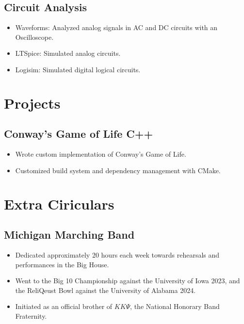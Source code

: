 \documentclass[10pt, letterpaper]{article}
\begin{document}
\subsection*{Circuit Analysis}
\begin{itemize}[noitemsep]
	\item Waveforms: Analyzed analog signals in AC and DC circuits with an Oscilloscope.	
	\item LTSpice: Simulated analog circuits.
	\item Logisim: Simulated digital logical circuits.
\end{itemize}

\section*{Projects}
\subsection*{Conway's Game of Life \text{\text{|}} C++}
\begin{itemize}[noitemsep]
	\item Wrote custom implementation of Conway's Game of Life.
	\item Customized build system and dependency management with CMake.
\end{itemize}

\section*{Extra Ciriculars}
\subsection*{Michigan Marching Band}
\begin{itemize}[noitemsep]
	\item Dedicated approximately 20 hours each week towards rehearsals and performances in the Big House.
	\item Went to the Big 10 Championship against the University of Iowa 2023,
		and the ReliQeust Bowl against the University of Alabama 2024.
	\item Initiated as an official brother of $K K\Psi$, the National Honorary Band Fraternity.
\end{itemize}
\end{document}
